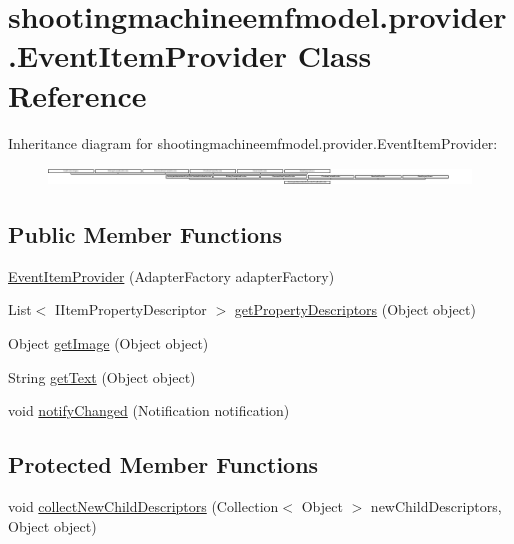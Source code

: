 \hypertarget{classshootingmachineemfmodel_1_1provider_1_1_event_item_provider}{\section{shootingmachineemfmodel.\-provider.\-Event\-Item\-Provider Class Reference}
\label{classshootingmachineemfmodel_1_1provider_1_1_event_item_provider}
}
Inheritance diagram for shootingmachineemfmodel.\-provider.\-Event\-Item\-Provider\-:\begin{figure}[H]
\begin{center}
\leavevmode
\includegraphics[height=0.499109cm]{classshootingmachineemfmodel_1_1provider_1_1_event_item_provider}
\end{center}
\end{figure}
\subsection*{Public Member Functions}
\begin{DoxyCompactItemize}
\item 
\hyperlink{classshootingmachineemfmodel_1_1provider_1_1_event_item_provider_ac3ccd616f3ca54dd34aa2d0578b102ee}{Event\-Item\-Provider} (Adapter\-Factory adapter\-Factory)
\item 
List$<$ I\-Item\-Property\-Descriptor $>$ \hyperlink{classshootingmachineemfmodel_1_1provider_1_1_event_item_provider_ab8c3a887da0f8759367feb80b1d5db75}{get\-Property\-Descriptors} (Object object)
\item 
Object \hyperlink{classshootingmachineemfmodel_1_1provider_1_1_event_item_provider_a185f96e0d8444b8ef1b29921b1587bab}{get\-Image} (Object object)
\item 
String \hyperlink{classshootingmachineemfmodel_1_1provider_1_1_event_item_provider_aa9274c5f79c2f9f21e495fb34068360c}{get\-Text} (Object object)
\item 
void \hyperlink{classshootingmachineemfmodel_1_1provider_1_1_event_item_provider_a1c7450c287f3f52ec279ada50f32924d}{notify\-Changed} (Notification notification)
\end{DoxyCompactItemize}
\subsection*{Protected Member Functions}
\begin{DoxyCompactItemize}
\item 
void \hyperlink{classshootingmachineemfmodel_1_1provider_1_1_event_item_provider_a97711d28c45e1fa9623a7a5803d15c6a}{collect\-New\-Child\-Descriptors} (Collection$<$ Object $>$ new\-Child\-Descriptors, Object object)
\end{DoxyCompactItemize}


